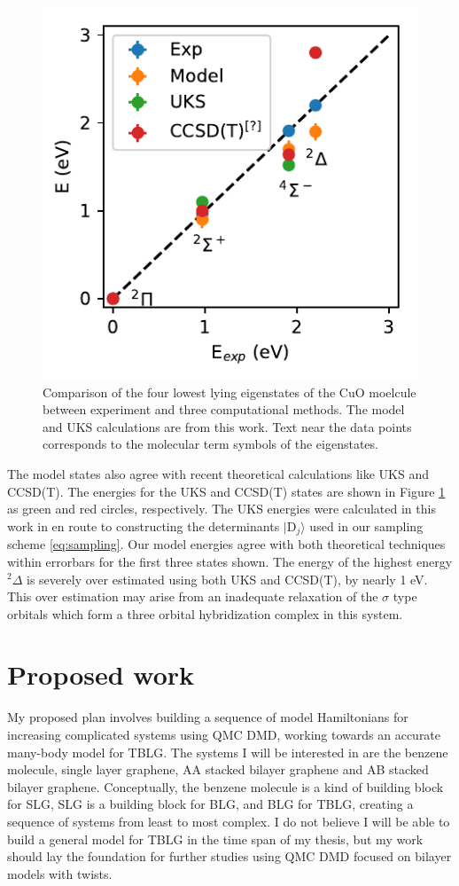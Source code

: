 \documentclass[12pt]{article}
\begin{document}
\begin{figure}
\centering
\includegraphics{./figs/comp.pdf}
\caption{Comparison of the four lowest lying eigenstates of the CuO moelcule between experiment and three computational methods. The model and UKS calculations are from this work. Text near the data points corresponds to the molecular term symbols of the eigenstates.}
\label{fig:comp}
\end{figure}

The model states also agree with recent theoretical calculations like UKS and CCSD(T).
The energies for the UKS and CCSD(T) states are shown in Figure \ref{fig:comp} as green and red circles, respectively.
The UKS energies were calculated in this work in en route to constructing the determinants $|\text{D}_j\rangle$ used in our sampling scheme \eqref{eq:sampling}.
Our model energies agree with both theoretical techniques within errorbars for the first three states shown.
The energy of the highest energy $^2\Delta$ is severely over estimated using both UKS and CCSD(T), by nearly 1 eV.
This over estimation may arise from an inadequate relaxation of the $\sigma$ type orbitals which form a three orbital hybridization complex in this system.

\section{Proposed work}
My proposed plan involves building a sequence of model Hamiltonians for increasing complicated systems using QMC DMD, working towards an accurate many-body model for TBLG.
The systems I will be interested in are the benzene molecule, single layer graphene, AA stacked bilayer graphene and AB stacked bilayer graphene.
Conceptually, the benzene molecule is a kind of building block for SLG, SLG is a building block for BLG, and BLG for TBLG, creating a sequence of systems from least to most complex.
I do not believe I will be able to build a general model for TBLG in the time span of my thesis, but my work should lay the foundation for further studies using QMC DMD focused on bilayer models with twists.
\end{document}
